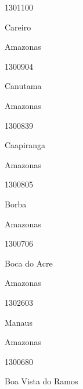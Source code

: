 \documentclass[
  letterpaper,
]{report}
\begin{document}
1301100

\n      

Careiro

\n    

\n    

\n      

Amazonas

\n      

1300904

\n      

Canutama

\n    

\n    

\n      

Amazonas

\n      

1300839

\n      

Caapiranga

\n    

\n    

\n      

Amazonas

\n      

1300805

\n      

Borba

\n    

\n    

\n      

Amazonas

\n      

1300706

\n      

Boca do Acre

\n    

\n    

\n      

Amazonas

\n      

1302603

\n      

Manaus

\n    

\n    

\n      

Amazonas

\n      

1300680

\n      

Boa Vista do Ramos

\n    

\n    
\end{document}
